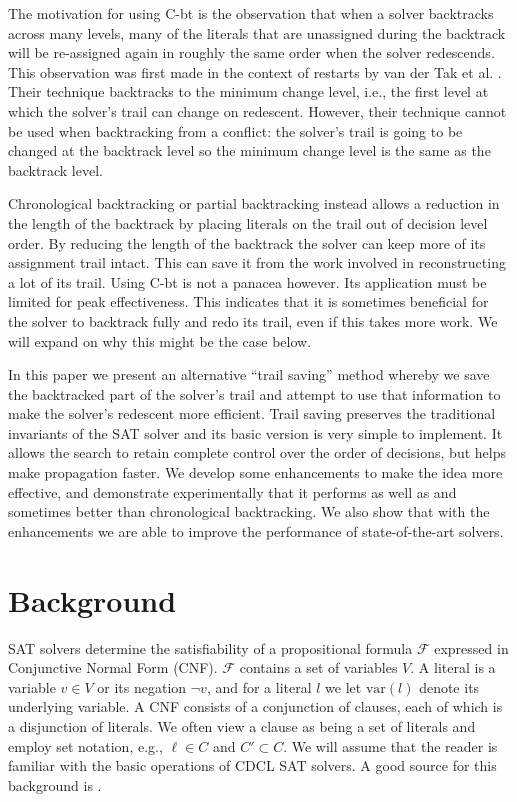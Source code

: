 \documentclass[runningheads]{llncs}
\newcommand{\sat}{SAT\xspace}
\newcommand{\var}{\text{var}}
\newcommand{\formula}{\ensuremath{\mathcal{F}}}
\newcommand{\cbt}{C-bt\xspace}
\begin{document}
The motivation for using \cbt is the observation that when a solver
backtracks across many levels, many of the literals that are
unassigned during the backtrack will be re-assigned again in roughly
the same order when the solver redescends. This observation was first
made in the context of restarts by van der Tak et
al. \cite{DBLP:journals/jsat/TakRH11}. Their technique backtracks to
the minimum change level, i.e., the first level at which the solver's
trail can change on redescent. However, their technique cannot be used
when backtracking from a conflict: the solver's trail is going to be
changed at the backtrack level so the minimum change level is the same
as the backtrack level. 

Chronological backtracking or partial backtracking instead allows a
reduction in the length of the backtrack by placing literals on the
trail out of decision level order. By reducing the length of the
backtrack the solver can keep more of its assignment trail
intact. This can save it from the work involved in reconstructing a
lot of its trail. Using \cbt is not a panacea however. Its application
must be limited for peak effectiveness. This indicates that it is
sometimes beneficial for the solver to backtrack fully and redo its
trail, even if this takes more work. We will expand on why this might
be the case below.

In this paper we present an alternative ``trail saving'' method whereby
we save the backtracked part of the solver's trail and attempt to
use that information to make the solver's redescent more
efficient. Trail saving preserves the traditional invariants of the
SAT solver and its basic version is very simple to implement. It
allows the search to retain complete control over the order of
decisions, but helps make propagation faster. We develop some
enhancements to make the idea more effective, and demonstrate
experimentally that it performs as well as and sometimes better than
chronological backtracking. We also show that with the enhancements we
are able to improve the performance of state-of-the-art solvers. 

\section{Background}
\label{sec:background}
\sat solvers determine the satisfiability of a propositional formula
$\formula$ expressed in Conjunctive Normal Form (CNF). $\formula$
contains a set of variables $V$. A literal is a variable $v\in V$ or
its negation $\lnot v$, and for a literal $l$ we let $\var(l)$ denote
its underlying variable. A CNF consists of a conjunction of clauses,
each of which is a disjunction of literals. We often view a clause as
being a set of literals and employ set notation, e.g., $\ell\in C$ and
$C'\subset C$. We will assume that the reader is familiar with the
basic operations of CDCL \sat solvers. A good source for this
background is \cite{DBLP:series/faia/SilvaLM09}.
\end{document}

